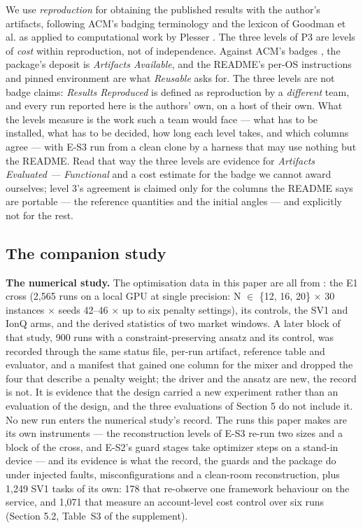 \documentclass[acmsmall,screen,review]{acmart}
\begin{document}
We use \textit{reproduction} for obtaining the published results with the author's artifacts, following ACM's badging terminology \cite{ref38} and the lexicon of Goodman et al. \cite{ref39} as applied to computational work by Plesser \cite{ref40}. The three levels of P3 are levels of \textit{cost} within reproduction, not of independence. Against ACM's badges \cite{ref38}, the package's deposit is \textit{Artifacts Available}, and the README's per-OS instructions and pinned environment are what \textit{Reusable} asks for. The three levels are not badge claims: \textit{Results Reproduced} is defined as reproduction by a \textit{different} team, and every run reported here is the authors' own, on a host of their own. What the levels measure is the work such a team would face --- what has to be installed, what has to be decided, how long each level takes, and which columns agree --- with E-S3 run from a clean clone by a harness that may use nothing but the README. Read that way the three levels are evidence for \textit{Artifacts Evaluated --- Functional} and a cost estimate for the badge we cannot award ourselves; level 3's agreement is claimed only for the columns the README says are portable --- the reference quantities and the initial angles --- and explicitly not for the rest.


\subsection{The companion study}

\textbf{The numerical study.} The optimisation data in this paper are all from \cite{ref1}: the E1 cross (2,565 runs on a local GPU at single precision: N $\in$ \{12, 16, 20\} $\times$ 30 instances $\times$ seeds 42--46 $\times$ up to six penalty settings), its controls, the SV1 and IonQ arms, and the derived statistics of two market windows. A later block of that study, 900 runs with a constraint-preserving ansatz and its control, was recorded through the same status file, per-run artifact, reference table and evaluator, and a manifest that gained one column for the mixer and dropped the four that describe a penalty weight; the driver and the ansatz are new, the record is not. It is evidence that the design carried a new experiment rather than an evaluation of the design, and the three evaluations of Section 5 do not include it. No new run enters the numerical study's record. The runs this paper makes are its own instruments --- the reconstruction levels of E-S3 re-run two sizes and a block of the cross, and E-S2's guard stages take optimizer steps on a stand-in device --- and its evidence is what the record, the guards and the package do under injected faults, misconfigurations and a clean-room reconstruction, plus 1,249 SV1 tasks of its own: 178 that re-observe one framework behaviour on the service, and 1,071 that measure an account-level cost control over six runs (Section 5.2, Table~S3 of the supplement).
\end{document}
